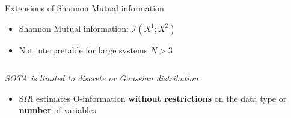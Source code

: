 \documentclass{beamer}
\renewcommand{\cite}[1]{\footnote<.->[frame]{\fullcite{#1}}}
\begin{document}
\begin{frame}{Extensions of Shannon Mutual information}

\begin{itemize}
    \item Shannon Mutual information: 
$\mathcal{I}(X^1; X^2)$%
\item  Not interpretable for large systems $N>3$
\end{itemize}



\begin{columns}
\end{columns}

\vspace{0.5cm}

\begin{center}
\textit{SOTA is limited to  discrete or Gaussian distribution}
\end{center}

\begin{itemize}
    \item S$\Omega$I estimates O-information \textbf{without restrictions} on the data type or \textbf{number} of variables
\end{itemize}

\end{frame}


\end{document}
